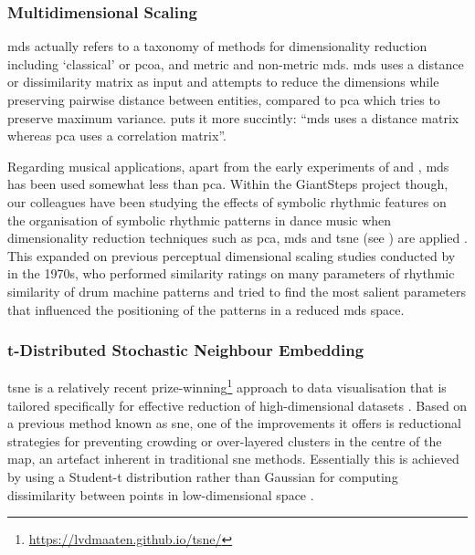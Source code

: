 \subsubsection{Multidimensional Scaling}

\acrfull{mds} actually refers to a taxonomy of methods for dimensionality reduction including `classical' or \acrfull{pcoa}, and metric and non-metric \acrshort{mds}. \acrshort{mds} uses a distance or dissimilarity matrix as input and attempts to reduce the dimensions while preserving pairwise distance between entities, compared to \acrshort{pca} which tries to preserve maximum variance. \cite{frisson2015} puts it more succintly: ``\acrshort{mds} uses a distance matrix whereas \acrshort{pca} uses a correlation matrix''.

Regarding musical applications, apart from the early experiments of \cite{Wessel1976, Wessel1979} and \cite{Grey1977, grey1977perceptual, grey1978perceptual}, \acrshort{mds} has been used somewhat less than \acrshort{pca}. Within the GiantSteps project though, our colleagues have been studying the effects of symbolic rhythmic features on the organisation of symbolic rhythmic patterns in dance music when dimensionality reduction techniques such as \acrshort{pca}, \acrshort{mds} and \acrshort{tsne} (see ) are applied \citep{Gomez-Marin2017, Gomez-Marin2016}. This expanded on previous perceptual dimensional scaling studies conducted by \cite{Gabrielsson1973a, Gabrielsson1973b} in the 1970s, who performed similarity ratings on  many parameters of rhythmic similarity of drum machine patterns and tried to find the most salient parameters that influenced the positioning of the patterns in a reduced \acrshort{mds} space.

\subsubsection{t-Distributed Stochastic Neighbour Embedding}

\label{sec:tsne}

\acrfull{tsne} is a relatively recent prize-winning\footnote{\url{https://lvdmaaten.github.io/tsne/}} approach to data visualisation that is tailored specifically for effective reduction of high-dimensional datasets \citep{VanDerMaaten2008}. Based on a previous method known as \acrfull{sne}, one of the improvements it offers is reductional strategies for preventing crowding or over-layered clusters in the centre of the map, an artefact inherent in traditional \acrshort{sne} methods. Essentially this is achieved by using a Student-t distribution rather than Gaussian for computing dissimilarity between points in low-dimensional space \citep{VanDerMaaten2008}.

